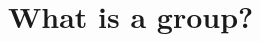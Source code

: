 \documentclass[../abstract_algebra.tex]{subfiles}
\begin{document}
    \section{What is a group?}
        \paragraph{}
\end{document}
